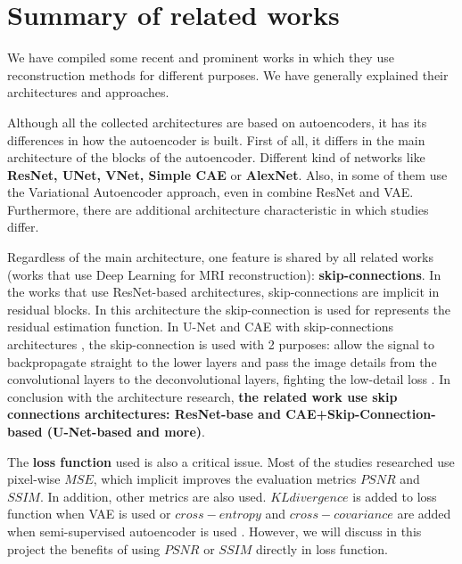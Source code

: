 \section{Summary of related works}
\label{section:sumary_soa}

We have compiled some recent and prominent works in which they use reconstruction methods for different purposes. We have generally explained their architectures and approaches.

Although all the collected architectures are based on autoencoders, it has its differences in how the autoencoder is built. First of all, it differs in the main architecture of the blocks of the autoencoder. Different kind of networks like \textbf{ResNet, UNet, VNet, Simple CAE} or \textbf{AlexNet}. Also, in some of them use the Variational Autoencoder approach, even in \cite{myronenko20183d} combine ResNet and VAE. 
Furthermore, there are additional architecture characteristic in which studies differ. 

Regardless of the main architecture, one feature is shared by all related works (works that use Deep Learning for MRI reconstruction): \textbf{skip-connections}. In the works that use ResNet-based \cite{myronenko20183d} \cite{learnvolrepreCODE} architectures, skip-connections are implicit in residual blocks. In this architecture the skip-connection is used for represents the residual estimation function. In U-Net \cite{2020inpainting} and CAE with skip-connections architectures \cite{bermudez2018t1autoencoder} \cite{superresolution}, the skip-connection is used with 2 purposes: allow the signal to backpropagate straight to the lower layers and pass the image details from the convolutional layers to the deconvolutional layers, fighting the low-detail loss \cite{superresolution}. In conclusion with the architecture research, \textbf{the related work use skip connections architectures: ResNet-base and CAE+Skip-Connection-based (U-Net-based and more)}.

The \textbf{loss function} used is also a critical issue. Most of the studies researched use pixel-wise $MSE$, which implicit improves the evaluation metrics $PSNR$ and $SSIM$. In addition, other metrics are also used. $KL divergence$ is added to loss function when VAE is used or $cross-entropy$ and $cross-covariance$ are added when semi-supervised autoencoder is used \cite{pinaya2019}. However, we will discuss in this project the benefits of using $PSNR$ or $SSIM$ directly in loss function. 

